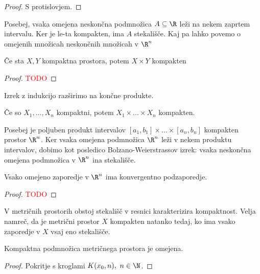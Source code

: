\begin{proof}
    S protislovjem.
\end{proof}

Posebej, vsaka omejena neskončna podmnožica $A \subseteq \R$ leži na nekem zaprtem intervalu. Ker je le-ta kompakten, ima $A$ stekališče. Kaj pa lahko povemo o omejenih množicah neskončnih množicah v \(\R^n\)

\newpage
\begin{izrek}
    Če sta $X, Y$ kompaktna prostora, potem $X \times Y$ kompakten
\end{izrek}

\begin{proof}
    \textcolor{red}{TODO}
\end{proof}

Izrek z indukcijo razširimo na končne produkte.
\begin{posledica}
    Če so $X_1, \ldots, X_n$ kompaktni, potem $X_1 \times \ldots \times X_n$ kompakten.
\end{posledica}

\begin{opomba}
    Posebej je poljuben produkt intervalov $[a_1, b_1] \times \ldots \times [a_n,b_n]$ kompakten prostor $\R^n$. Ker vsaka omejena podmnožica $\R^n$ leži v nekem produktu intervalov, dobimo kot posledico Bolzano-Weierstrassov izrek: vsaka neskončna omejena podmnožica v \(\R^n\) ina stekališče.
\end{opomba}

\begin{izrek}
    Vsako omejeno zaporedje v $\R^n$ ima konvergentno podzaporedje.
\end{izrek}

\begin{proof}
    \textcolor{red}{TODO}
\end{proof}

\begin{opomba}
    V metričnih prostorih obstoj stekališč v resnici karakterizira kompaktnost. Velja namreč, da je metrični prostor $X$ kompakten natanko tedaj, ko ima vsako zaporedje v $X$ vsaj eno stekališče.
\end{opomba}

\begin{trditev}
    Kompaktna podmnožica metričnega prostora je omejena.
\end{trditev}

\begin{proof}
    Pokritje s kroglami $K(x_0,n), \ n \in \N$.
\end{proof}

